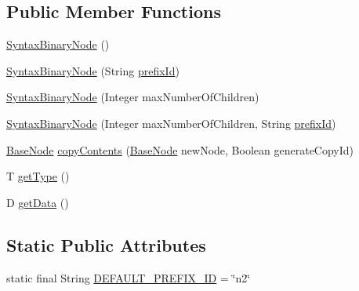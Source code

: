 \subsection*{Public Member Functions}
\begin{DoxyCompactItemize}
\item 
\hyperlink{classit_1_1emarolab_1_1cagg_1_1core_1_1language_1_1SyntaxBinaryNode_3_01T_01extends_01Enum_3_04_6f6f52bca8b05a51e94968cedaccd1f1_a112b6e4e0c7c11370f66b685cb9e75f4}{Syntax\-Binary\-Node} ()
\item 
\hyperlink{classit_1_1emarolab_1_1cagg_1_1core_1_1language_1_1SyntaxBinaryNode_3_01T_01extends_01Enum_3_04_6f6f52bca8b05a51e94968cedaccd1f1_ace60d82ad8c0e52b1196bfe4d24ee47e}{Syntax\-Binary\-Node} (String \hyperlink{classit_1_1emarolab_1_1cagg_1_1core_1_1BaseNode_a1e4662066a1e580f3ef9a1ad7c483dd8}{prefix\-Id})
\item 
\hyperlink{classit_1_1emarolab_1_1cagg_1_1core_1_1language_1_1SyntaxBinaryNode_3_01T_01extends_01Enum_3_04_6f6f52bca8b05a51e94968cedaccd1f1_adb299cb62c968d909b4ed0cd102800e5}{Syntax\-Binary\-Node} (Integer max\-Number\-Of\-Children)
\item 
\hyperlink{classit_1_1emarolab_1_1cagg_1_1core_1_1language_1_1SyntaxBinaryNode_3_01T_01extends_01Enum_3_04_6f6f52bca8b05a51e94968cedaccd1f1_a6d21cb9c400eef5058705730aaffbd55}{Syntax\-Binary\-Node} (Integer max\-Number\-Of\-Children, String \hyperlink{classit_1_1emarolab_1_1cagg_1_1core_1_1BaseNode_a1e4662066a1e580f3ef9a1ad7c483dd8}{prefix\-Id})
\item 
\hyperlink{classit_1_1emarolab_1_1cagg_1_1core_1_1BaseNode}{Base\-Node} \hyperlink{classit_1_1emarolab_1_1cagg_1_1core_1_1language_1_1SyntaxBinaryNode_3_01T_01extends_01Enum_3_04_6f6f52bca8b05a51e94968cedaccd1f1_a879fff9a4bfcddc00a2fa797a144243e}{copy\-Contents} (\hyperlink{classit_1_1emarolab_1_1cagg_1_1core_1_1BaseNode}{Base\-Node} new\-Node, Boolean generate\-Copy\-Id)
\item 
T \hyperlink{classit_1_1emarolab_1_1cagg_1_1core_1_1language_1_1SyntaxBinaryNode_3_01T_01extends_01Enum_3_04_6f6f52bca8b05a51e94968cedaccd1f1_a5434ed378781c972c5673afc4106f84f}{get\-Type} ()
\item 
D \hyperlink{classit_1_1emarolab_1_1cagg_1_1core_1_1language_1_1SyntaxBinaryNode_3_01T_01extends_01Enum_3_04_6f6f52bca8b05a51e94968cedaccd1f1_a1385e73c6903d447611f22e3bfa88133}{get\-Data} ()
\end{DoxyCompactItemize}
\subsection*{Static Public Attributes}
\begin{DoxyCompactItemize}
\item 
static final String \hyperlink{classit_1_1emarolab_1_1cagg_1_1core_1_1language_1_1SyntaxBinaryNode_3_01T_01extends_01Enum_3_04_6f6f52bca8b05a51e94968cedaccd1f1_a3dfeebacbbeae04664a1fdd40a4da3f1}{D\-E\-F\-A\-U\-L\-T\-\_\-\-P\-R\-E\-F\-I\-X\-\_\-\-I\-D} = \char`\"{}n2\char`\"{}
\end{DoxyCompactItemize}
